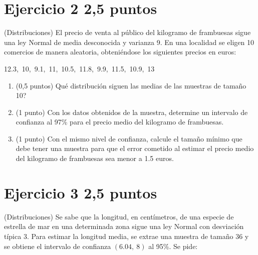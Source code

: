 \documentclass[11pt]{article}
\begin{document}
\section*{Ejercicio 2 \hfill 2,5 puntos} (Distribuciones) El precio de venta al público del kilogramo de frambuesas sigue una ley Normal de media desconocida y varianza 9. En una localidad se eligen 10 comercios de manera aleatoria, obteniéndose los siguientes precios en euros:

\begin{center}
12.3,\ 10,\ 9.1,\ 11,\ 10.5,\ 11.8,\ 9.9,\ 11.5,\ 10.9,\ 13
\end{center}

\begin{enumerate}[label=(\alph*)]

  \item (0,5 puntos)  \textquestiondown{}Qué distribución siguen las medias de las muestras de tamaño 10?

  

  \item (1 punto)  Con los datos obtenidos de la muestra, determine un intervalo de confianza al 97\% para el precio medio del kilogramo de frambuesas.

  

  \item (1 punto)  Con el mismo nivel de confianza, calcule el tamaño mínimo que debe tener una muestra para que el error cometido al estimar el precio medio del kilogramo de frambuesas sea menor a 1.5 euros.

  

\end{enumerate}


\clearpage
\section*{Ejercicio 3 \hfill 2,5 puntos}  (Distribuciones) Se sabe que la longitud, en centímetros, de una especie de estrella de mar en una determinada zona sigue una ley Normal con desviación típica 3. Para estimar la longitud media, se extrae una muestra de tamaño 36 y se obtiene el intervalo de confianza \( (6.04,\ 8) \) al 95\%. Se pide:
\end{document}
